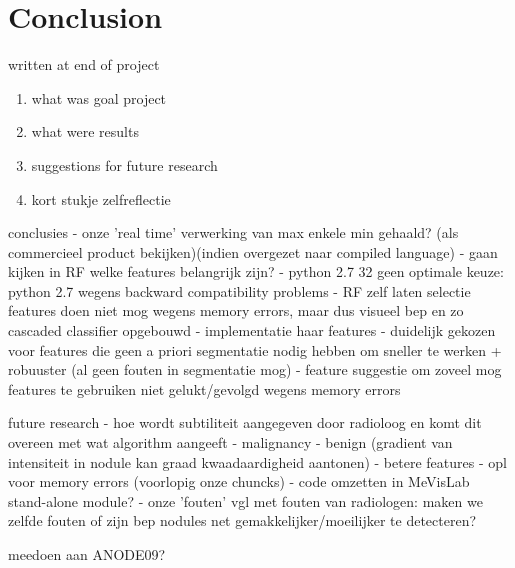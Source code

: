 \section{Conclusion}
written at end of project

\begin{enumerate}
\item what was goal project
\item what were results
\item suggestions for future research
\item kort stukje zelfreflectie
\end{enumerate}

conclusies
- onze 'real time' verwerking van max enkele min gehaald? (als commercieel
product bekijken)(indien overgezet naar compiled language)
- gaan kijken in RF welke features belangrijk zijn?
- python 2.7 32 geen optimale keuze: python 2.7 wegens backward compatibility
problems
- RF zelf laten selectie features doen niet mog wegens memory errors, maar dus
visueel bep en zo cascaded classifier opgebouwd
- implementatie haar features
- duidelijk gekozen voor features die geen a priori segmentatie nodig hebben om
sneller te werken + robuuster (al geen fouten in segmentatie mog)
- feature suggestie om zoveel mog features te gebruiken niet gelukt/gevolgd
wegens memory errors











future research
- hoe wordt subtiliteit aangegeven door radioloog en komt dit overeen met wat
algorithm aangeeft
- malignancy - benign (gradient van intensiteit in nodule kan graad
kwaadaardigheid aantonen)
- betere features
- opl voor memory errors (voorlopig onze chuncks)
- code omzetten in MeVisLab stand-alone module?
- onze 'fouten' vgl met fouten van radiologen: maken we zelfde fouten of zijn
bep nodules net gemakkelijker/moeilijker te detecteren?

meedoen aan ANODE09?
